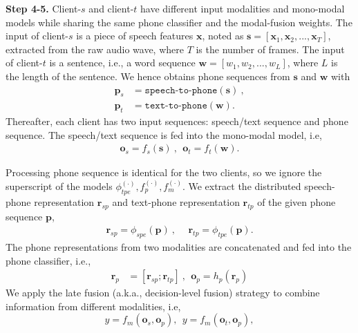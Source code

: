 \documentclass[11pt]{article}
\begin{document}
\textbf{Step 4-5.} Client-$s$ and client-$t$ have different input modalities and mono-modal models while sharing the same phone classifier and the modal-fusion weights. The input of client-$s$ is a piece of speech features $\mathbf{x}$, noted as $\mathbf{s}=\left[\mathbf{x}_1,\mathbf{x}_2,...,\mathbf{x}_T\right]$, extracted from the raw audio wave, where $T$ is the number of frames.  The input of client-$t$ is a sentence, i.e., a word sequence $\mathbf{w}=\left[w_1,w_2,...,w_L\right]$, where $L$ is the length of the sentence. We hence obtains phone sequences from $\mathbf{s}$ and $\mathbf{w}$ with
\begin{equation}
\begin{aligned}
  \mathbf{p}_s &= \texttt{speech-to-phone}(\mathbf{s})~,\\
  \mathbf{p}_t &=\texttt{text-to-phone}(\mathbf{w}).
\end{aligned}
\label{eq:1}
\end{equation}
Thereafter, each client has two input sequences: speech/text sequence and phone sequence. The speech/text sequence is fed into the mono-modal model, i.e,
\begin{equation}
\begin{aligned}
    \mathbf{o}_s = {f}_s(\mathbf{s})~,~~\mathbf{o}_t = {f}_t(\mathbf{w}).
\end{aligned}
\label{eq:2}
\end{equation} 

Processing phone sequence is identical for the two clients, so we ignore the superscript of the models ${\phi}_{tpe}^{(\cdot)}, {f}_{p}^{(\cdot)}, {f}_m^{(\cdot)}$. We extract the distributed speech-phone representation $\mathbf{r}_{sp}$ and text-phone representation $\mathbf{r}_{tp}$ of the given phone sequence $\mathbf{p}$,
\begin{align}
    \mathbf{r}_{sp}  = \phi_{spe}(\mathbf{p})~,&~~\mathbf{r}_{tp} = \phi_{tpe}(\mathbf{p}).
\end{align}
The phone representations from two modalities are concatenated and fed into the phone classifier, i.e., 
\begin{align}
    \mathbf{r}_{p} &= [\mathbf{r}_{sp};\mathbf{r}_{tp}]~,~~\mathbf{o}_p = h_p(\mathbf{r}_{p})
\end{align} 
We apply the late fusion (a.k.a., decision-level fusion) strategy \cite{zadeh2017tensor} to combine information from different modalities, i.e,
\begin{equation}
    y = {f}_{m}(\mathbf{o}_{s}, \mathbf{o}_p),~~y = {f}_{m}(\mathbf{o}_{t}, \mathbf{o}_p), \label{eq:7}
\end{equation}
\end{document}
